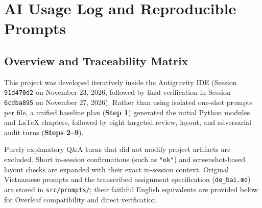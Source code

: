 \chapter{AI Usage Log and Reproducible Prompts}
\label{app:prompts}

\section{Overview and Traceability Matrix}
This project was developed iteratively inside the Antigravity IDE (Session \texttt{91d470d2} on November 23, 2026, followed by final verification in Session \texttt{6cdba895} on November 27, 2026). Rather than using isolated one-shot prompts per file, a unified baseline plan (\textbf{Step 1}) generated the initial Python modules and LaTeX chapters, followed by eight targeted review, layout, and adversarial audit turns (\textbf{Steps 2--9}).

Purely explanatory Q\&A turns that did not modify project artifacts are excluded. Short in-session confirmations (such as \texttt{"ok"}) and screenshot-based layout checks are expanded with their exact in-session context. Original Vietnamese prompts and the transcribed assignment specification (\texttt{de\_bai.md}) are stored in \texttt{src/prompts/}; their faithful English equivalents are provided below for Overleaf compatibility and direct verification.

